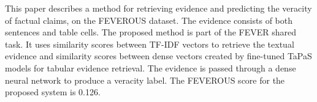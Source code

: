 This paper describes a method for retrieving evidence and predicting the veracity of factual claims, on the FEVEROUS dataset. The evidence consists of both sentences and table cells. The proposed method is part of the FEVER shared task. It uses similarity scores between TF-IDF vectors to retrieve the textual evidence and similarity scores between dense vectors created by fine-tuned TaPaS models for tabular evidence retrieval. The evidence is passed through a dense neural network to produce a veracity label. The FEVEROUS score for the proposed system is 0.126.

